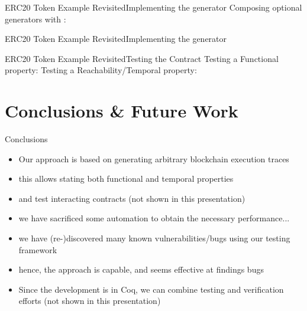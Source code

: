 \begin{frame}{ERC20 Token Example Revisited}{Implementing the generator}
Composing optional generators with :
\gtokenact
\end{frame}

\begin{frame}{ERC20 Token Example Revisited}{Implementing the generator}
\gtransferfrom
\end{frame}





\begin{frame}{ERC20 Token Example Revisited}{Testing the Contract}
Testing a Functional property:
\testtransfer
Testing a Reachability/Temporal property:
\testtransferfromsafe
\end{frame}


\section{Conclusions \& Future Work}
\begin{frame}{Conclusions}
\begin{itemize}
    \item Our approach is based on generating arbitrary blockchain execution traces
    \item this allows stating both functional and temporal properties
    \item and test interacting contracts (not shown in this presentation)
    \item we have sacrificed some automation to obtain the necessary performance...
    \item we have (re-)discovered many known vulnerabilities/bugs using our testing framework
    \item hence, the approach is capable, and seems effective at findings bugs
    \item Since the development is in Coq, we can combine testing and verification efforts (not shown in this presentation)
\end{itemize}
\end{frame}

